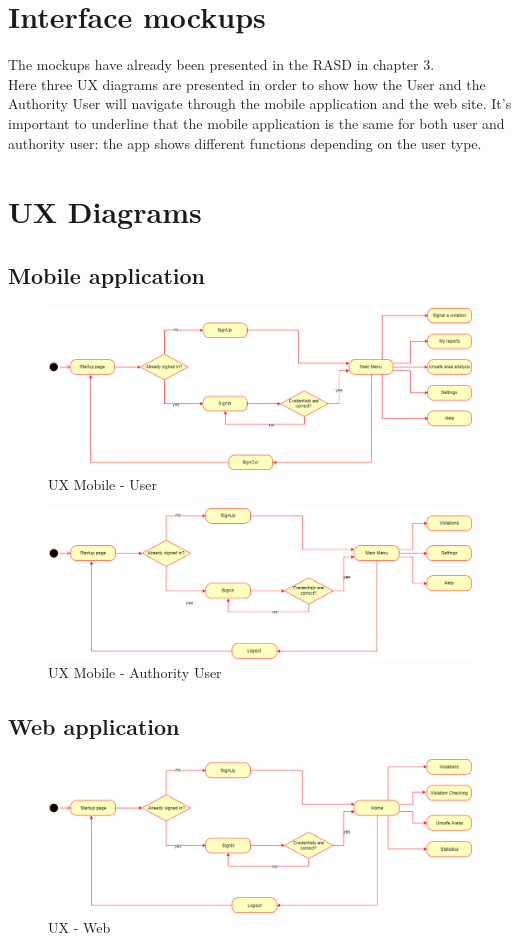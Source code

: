     \section{Interface mockups}
     The mockups have already been presented in the RASD in chapter 3. \\
     Here three UX diagrams are presented in order to show how the User and the
     Authority User will navigate through the mobile application and the web
     site. It's important to underline that the mobile application is the same
     for both user and authority user: the app shows different functions depending on the user type. 

     \section{UX Diagrams}
          \subsection{Mobile application}
          \begin{figure}[H]
               \includegraphics[scale = 0.4]{dd/resources/images/UX-diagram-mobile-user.png}
               \caption{UX Mobile - User}        
           \end{figure}   
           \begin{figure}[H]
               \includegraphics[scale = 0.4]{dd/resources/images/UX-diagram-mobile-authorityUser.png}
               \caption{UX Mobile - Authority User}        
           \end{figure}             
          \subsection{Web application}
          \begin{figure}[H]
               \includegraphics[scale = 0.4]{dd/resources/images/UX-diagram-web.png}
               \caption{UX - Web}        
           \end{figure}      